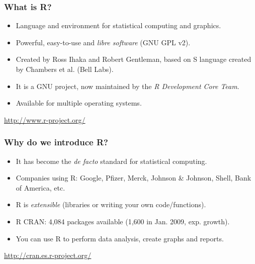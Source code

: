 \documentclass{beamer}
\begin{document}
\begin{frame}

\frametitle{What is R?}
\begin{itemize}
\item Language and environment for statistical computing and graphics.
\item Powerful, easy-to-use and \textit{libre software} (GNU GPL v2).
\item Created by Ross Ihaka and Robert Gentleman, based on S language created by Chambers et al. (Bell Labs).
\item It is a GNU project, now maintained by the \textit{R Development Core Team}.
\item Available for multiple operating systems.
\end{itemize}

\begin{flushright}
 \url{http://www.r-project.org/}
\end{flushright}


\end{frame}


\begin{frame}

\frametitle{Why do we introduce R?}
\begin{itemize}
\item It has become the \textit{de facto} standard for statistical computing.
\item Companies using R: Google, Pfizer, Merck, Johnson \& Johnson, Shell, Bank of America, etc.
\item R is \textit{extensible} (libraries or writing your own code/functions).
\item R CRAN: 4,084 packages available (1,600 in Jan. 2009, exp. growth).
\item You can use R to perform data analysis, create graphs and reports.
\end{itemize}

\begin{flushright}
 \url{http://cran.es.r-project.org/}
\end{flushright}

\end{frame}

\end{document}
